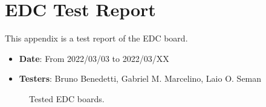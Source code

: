 %
%
%
%
%

%
%
%
%
%

\chapter{EDC Test Report} \label{anx:edc-report}

This appendix is a test report of the EDC board.

\begin{itemize}
    \item \textbf{Date}: From 2022/03/03 to 2022/03/XX
    \item \textbf{Testers}: Bruno Benedetti, Gabriel M. Marcelino, Laio O. Seman
\end{itemize}

\begin{figure}[!htb]
    \begin{center}

        \caption{Tested EDC boards.}
        \label{fig:edc-boards-test}
    \end{center}
\end{figure}

